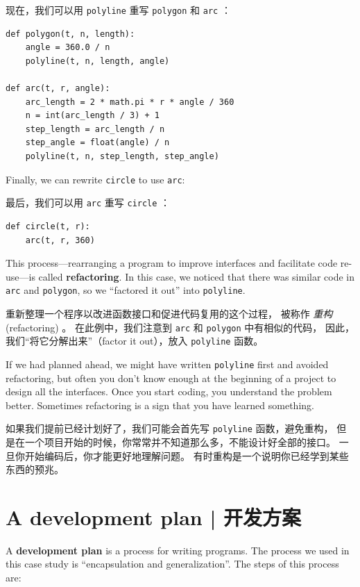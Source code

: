 现在，我们可以用 \lstinline{polyline} 重写 \lstinline{polygon} 和 \lstinline{arc} ：

\begin{lstlisting}
def polygon(t, n, length):
    angle = 360.0 / n
    polyline(t, n, length, angle)

def arc(t, r, angle):
    arc_length = 2 * math.pi * r * angle / 360
    n = int(arc_length / 3) + 1
    step_length = arc_length / n
    step_angle = float(angle) / n
    polyline(t, n, step_length, step_angle)
\end{lstlisting}

%
Finally, we can rewrite {\tt circle} to use {\tt arc}:

最后，我们可以用 \lstinline{arc} 重写 \lstinline{circle} ：

\begin{lstlisting}
def circle(t, r):
    arc(t, r, 360)
\end{lstlisting}

%
This process---rearranging a program to improve
interfaces and facilitate code re-use---is called {\bf refactoring}.
In this case, we noticed that there was similar code in {\tt arc} and
{\tt polygon}, so we ``factored it out'' into {\tt polyline}.

重新整理一个程序以改进函数接口和促进代码复用的这个过程，
被称作 \emph{重构} (refactoring) 。
在此例中，我们注意到 \lstinline{arc} 和 \lstinline{polygon} 中有相似的代码，
因此，我们“将它分解出来”（factor it out），放入 \lstinline{polyline} 函数。

If we had planned ahead, we might have written {\tt polyline} first
and avoided refactoring, but often you don't know enough at the
beginning of a project to design all the interfaces.  Once you start
coding, you understand the problem better.  Sometimes refactoring is a
sign that you have learned something.

如果我们提前已经计划好了，我们可能会首先写 \lstinline{polyline} 函数，避免重构，
但是在一个项目开始的时候，你常常并不知道那么多，不能设计好全部的接口。
一旦你开始编码后，你才能更好地理解问题。
有时重构是一个说明你已经学到某些东西的预兆。


\section{A development plan  |  开发方案}

A {\bf development plan} is a process for writing programs.  The
process we used in this case study is ``encapsulation and
generalization''.  The steps of this process are:

